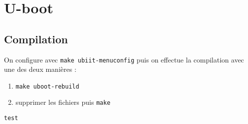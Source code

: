 \documentclass[resume]{subfiles}
\begin{document}
\section{U-boot}
\subsection{Compilation}
On configure avec \verb!make ubiit-menuconfig! puis on effectue la compilation avec une des deux manières :
\begin{enumerate}
\item \verb!make uboot-rebuild!
\item supprimer les fichiers puis \verb!make!
\end{enumerate}


\begin{lstlisting}[style=bash]
test

\end{lstlisting}
\end{document}
